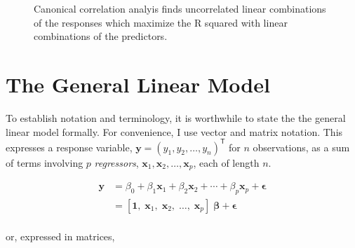 \documentclass[
  letterpaper,
  10pt,
  krantz2]{krantz}
\begin{document}
\begin{figure}


\caption{\label{fig-lin-comb4}Canonical correlation analyis finds
uncorrelated linear combinations of the responses which maximize the R
squared with linear combinations of the predictors.}

\end{figure}%

\section{The General Linear Model}\label{sec-GLM}

To establish notation and terminology, it is worthwhile to state the the
general linear model formally. For convenience, I use vector and matrix
notation. This expresses a response variable,
\(\mathbf{y} = (y_1, y_2, \dots , y_n)^\mathsf{T}\) for \(n\)
observations, as a sum of terms involving \(p\) \emph{regressors},
\(\mathbf{x}_1, \mathbf{x}_2, \dots , \mathbf{x}_p\), each of length
\(n\).

\begin{align*}
\mathbf{y} & = \beta_0 + \beta_1 \mathbf{x}_1 + \beta_2 \mathbf{x}_2 + \cdots + \beta_p \mathbf{x}_p + \mathbf{\epsilon} \\
           & = \left[ \mathbf{1},\; \mathbf{x}_1,\; \mathbf{x}_2,\; \dots ,\; \mathbf{x}_p \right] \; \boldsymbol{\beta} + \boldsymbol{\epsilon} \\
\end{align*}

or, expressed in matrices,
\end{document}
